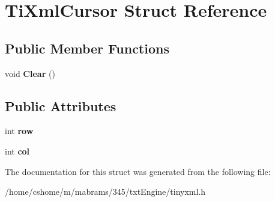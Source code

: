 \hypertarget{struct_ti_xml_cursor}{
\section{TiXmlCursor Struct Reference}
\label{struct_ti_xml_cursor}
}
\subsection*{Public Member Functions}
\begin{DoxyCompactItemize}
\item 
\hypertarget{struct_ti_xml_cursor_a1e6fa622b59dafb71b6efe595105dcdd}{
void {\bfseries Clear} ()}
\label{struct_ti_xml_cursor_a1e6fa622b59dafb71b6efe595105dcdd}

\end{DoxyCompactItemize}
\subsection*{Public Attributes}
\begin{DoxyCompactItemize}
\item 
\hypertarget{struct_ti_xml_cursor_a5b54dd949820c2db061e2be41f3effb3}{
int {\bfseries row}}
\label{struct_ti_xml_cursor_a5b54dd949820c2db061e2be41f3effb3}

\item 
\hypertarget{struct_ti_xml_cursor_a5694d7ed2c4d20109d350c14c417969d}{
int {\bfseries col}}
\label{struct_ti_xml_cursor_a5694d7ed2c4d20109d350c14c417969d}

\end{DoxyCompactItemize}


The documentation for this struct was generated from the following file:\begin{DoxyCompactItemize}
\item 
/home/cshome/m/mabrams/345/txtEngine/tinyxml.h\end{DoxyCompactItemize}
